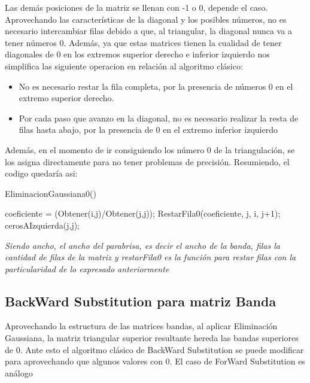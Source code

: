 Las demás posiciones de la matriz se llenan con -1 o 0, depende el caso.\\ 
Aprovechando las características de la diagonal y los posibles números, no es necesario intercambiar filas debido a que, al triangular, la diagonal nunca va a tener números 0. Además, ya que estas matrices tienen la cualidad de tener diagonales de 0 en los extremos superior derecho e inferior izquierdo nos simplifica las siguiente operacion en relación al algoritmo clásico:

\begin{itemize}
\item No es necesario restar la fila completa, por la presencia de números 0 en el extremo superior derecho.
\item Por cada paso que avanzo en la diagonal, no es necesario realizar la resta de filas hasta abajo, por la presencia de 0 en el extremo inferior izquierdo  
\end{itemize}

Además, en el momento de ir consiguiendo los número 0 de la triangulación, se los asigna directamente para no tener problemas de precisión. Resumiendo, el codigo quedaría asi:\\

\begin{algorithm}[H]
\caption{EliminacionGaussiana0()}
\begin{algorithmic}[1]

        \State coeficiente  = (Obtener(i,j)/Obtener(j,j));
		\State  RestarFila0(coeficiente, j, i, j+1);
	\EndFor 
    		\State cerosAIzquierda(j,j);
\EndFor

\end{algorithmic}
\end{algorithm}





\textit{Siendo ancho, el ancho del parabrisa, es decir el ancho de la banda, filas la cantidad de filas de la matriz y restarFila0 es la función para restar filas con la particularidad de lo expresado anteriormente}
	
\subsection{BackWard Substitution para matriz Banda}
Aprovechando la estructura de las matrices bandas, al aplicar Eliminación Gaussiana, la matriz triangular superior resultante hereda las bandas superiores de 0. Ante esto el algoritmo clásico de BackWard Substitution se puede modificar para aprovechando que algunos valores con 0. El caso de ForWard Substitution es análogo



